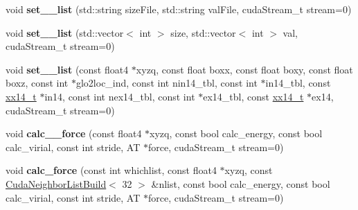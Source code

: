 \begin{DoxyCompactItemize}
\item 
\hypertarget{classCudaPMEDirectForce_aa56da928dbf9836e3af2b0d8d1b11a4a}{}\label{classCudaPMEDirectForce_aa56da928dbf9836e3af2b0d8d1b11a4a} 
void {\bfseries set\+\_\+\_\+list} (std\+::string size\+File, std\+::string val\+File, cuda\+Stream\+\_\+t stream=0)
\item 
\hypertarget{classCudaPMEDirectForce_a0ab6c1ff2383bba0e7fbd4e2e42f00d7}{}\label{classCudaPMEDirectForce_a0ab6c1ff2383bba0e7fbd4e2e42f00d7} 
void {\bfseries set\+\_\+\_\+list} (std\+::vector$<$ int $>$ size, std\+::vector$<$ int $>$ val, cuda\+Stream\+\_\+t stream=0)
\item 
\hypertarget{classCudaPMEDirectForce_a8b1cf6a999c187060b3480deb7cd3988}{}\label{classCudaPMEDirectForce_a8b1cf6a999c187060b3480deb7cd3988} 
void {\bfseries set\+\_\+\_\+list} (const float4 $\ast$xyzq, const float boxx, const float boxy, const float boxz, const int $\ast$glo2loc\+\_\+ind, const int nin14\+\_\+tbl, const int $\ast$in14\+\_\+tbl, const \hyperlink{structxx14__t}{xx14\+\_\+t} $\ast$in14, const int nex14\+\_\+tbl, const int $\ast$ex14\+\_\+tbl, const \hyperlink{structxx14__t}{xx14\+\_\+t} $\ast$ex14, cuda\+Stream\+\_\+t stream=0)
\item 
\hypertarget{classCudaPMEDirectForce_ad1d326d6cbf3c5c0ce2341145e449b29}{}\label{classCudaPMEDirectForce_ad1d326d6cbf3c5c0ce2341145e449b29} 
void {\bfseries calc\+\_\+\_\+force} (const float4 $\ast$xyzq, const bool calc\+\_\+energy, const bool calc\+\_\+virial, const int stride, AT $\ast$force, cuda\+Stream\+\_\+t stream=0)
\item 
\hypertarget{classCudaPMEDirectForce_aa194f6e6ecccb4f8642bd4a00d982e0a}{}\label{classCudaPMEDirectForce_aa194f6e6ecccb4f8642bd4a00d982e0a} 
void {\bfseries calc\+\_\+force} (const int whichlist, const float4 $\ast$xyzq, const \hyperlink{classCudaNeighborListBuild}{Cuda\+Neighbor\+List\+Build}$<$ 32 $>$ \&nlist, const bool calc\+\_\+energy, const bool calc\+\_\+virial, const int stride, AT $\ast$force, cuda\+Stream\+\_\+t stream=0)
\end{DoxyCompactItemize}
